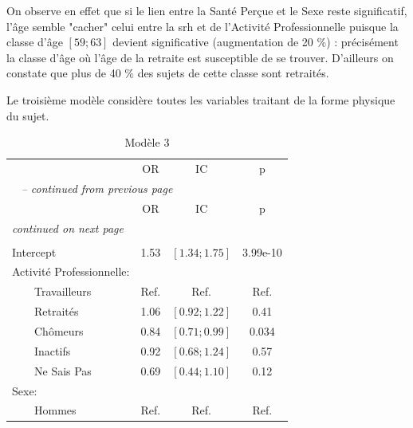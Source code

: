 \documentclass{book}
\begin{document}
On observe en effet que si le lien entre la Santé Perçue et le Sexe reste significatif, l'âge semble "cacher" celui entre la srh et de l'Activité Professionnelle puisque la classe d'âge $\left[59 ; 63\right]$ devient significative (augmentation de 20 $\%$) : précisément la classe d'âge où l'âge de la retraite est susceptible de se trouver. D'ailleurs on constate que plus de 40 $\%$ des sujets de cette classe sont retraités.\\

\bigskip

\noindent
Le troisième modèle considère toutes les variables traitant de la forme physique du sujet.\\

\begin{longtable}{lccc}\caption{Modèle 3}\\
    \hline  
		& \multirow{2}{*}{OR} & \multirow{2}{*}{IC}& \multirow{2}{*}{p}\\ 
		 &    				    &    			    &                  \\ 
   \hline
    \hline     
    \endfirsthead 
    \multicolumn{4}{l}{\tablename\ \thetable{} \textit{-- continued from previous page}}\\ 
    \hline
		& \multirow{2}{*}{OR} & \multirow{2}{*}{IC}& \multirow{2}{*}{p}\\ 
		&    				    &    			    &                  \\ 
    \hline
    \hline  
    \endhead   
    \hline
    \multicolumn{4}{l}{\textit{continued on next page}} \\ 
    \endfoot   
    \multicolumn{4}{l}{}  \\ 
    \endlastfoot  
Intercept & 1.53 & $\left[1.34 ; 1.75 \right]$ & 3.99e-10\\
Activité Professionnelle: &              &              &	\\ 
$\qquad$Travailleurs 		&		Ref.		& 	Ref.		&	Ref.\\ 
$\qquad$Retraités&1.06 &$\left[0.92 ; 1.22 \right]$ & 0.41\\ 
$\qquad$Chômeurs & 0.84& $\left[0.71 ; 0.99\right]$& 0.034\\ 
$\qquad$Inactifs  & 0.92& $\left[0.68 ; 1.24\right]$& 0.57\\ 
$\qquad$Ne Sais Pas & 0.69& $\left[0.44 ; 1.10\right]$ & 0.12 \\ 
Sexe: &              &              &                          \\ 
$\qquad$Hommes &Ref. & Ref.& Ref.\\ 

\end{longtable}
\end{document}
